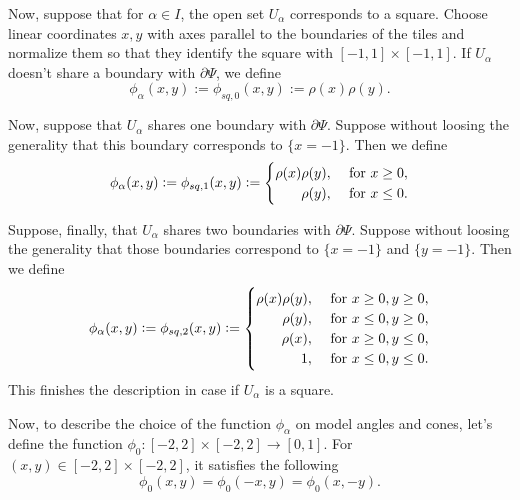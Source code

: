 \documentclass[12pt]{article}
\numberwithin{equation}{section}
\theoremstyle{theorem}
\theoremstyle{definition}
\theoremstyle{remark}
\begin{document}
	\par Now, suppose that for $\alpha \in I$, the open set $U_{\alpha}$ corresponds to a square. 
	Choose linear coordinates $x, y$ with axes parallel to the boundaries of the tiles and normalize them so that they identify the square with $[-1, 1] \times [-1, 1]$.
	If $U_{\alpha}$ doesn't share a boundary with $\partial \Psi$, we define 
	\begin{equation}
		\phi_{\alpha}(x, y) := \phi_{sq, 0}(x, y) := \rho(x)\rho(y).
	\end{equation}
	\par Now, suppose that $U_{\alpha}$ shares one boundary with $\partial \Psi$.
	Suppose without loosing the generality that this boundary corresponds to $\{x = -1\}$.
	Then we define 
	\begin{equation}\label{eq_psi_sq_1}
		\phi_{\alpha}(x, y) := \phi_{sq, 1}(x, y) := 
		\begin{cases} 
			\hfill \rho(x)\rho(y), & \text{ for $x \geq 0$}, \\
			\hfill \rho(y), & \text{ for $x \leq 0$}.
 		\end{cases} 
	\end{equation}
	\par Suppose, finally, that $U_{\alpha}$ shares two boundaries with $\partial \Psi$.
	Suppose without loosing the generality that those boundaries correspond to $\{x = -1\}$ and $\{ y = -1 \}$.
	Then we define 
	\begin{equation}\label{eq_psi_sq_2}
		\phi_{\alpha}(x, y) := \phi_{sq, 2}(x, y) := 
		\begin{cases} 
			\hfill \rho(x)\rho(y), & \text{ for $x \geq 0, y \geq 0$}, \\
			\hfill \rho(y), & \text{ for $x \leq 0, y \geq 0$}, \\
			\hfill \rho(x), & \text{ for $x \geq 0, y \leq 0$}, \\
			\hfill 1, & \text{ for $x \leq 0, y \leq 0$}.
 		\end{cases} 
	\end{equation}
	This finishes the description in case if $U_{\alpha}$ is a square.
	\par Now, to describe the choice of the function $\phi_{\alpha}$ on model angles and cones, let's define the function $\phi_{0} : [-2, 2] \times [-2, 2] \to [0, 1]$. For $(x, y) \in [-2, 2] \times [-2, 2]$, it satisfies the following 
	\begin{equation}
		\phi_{0}(x, y) = \phi_{0}(-x, y) = \phi_{0}(x, -y).
	\end{equation}
\end{document}
